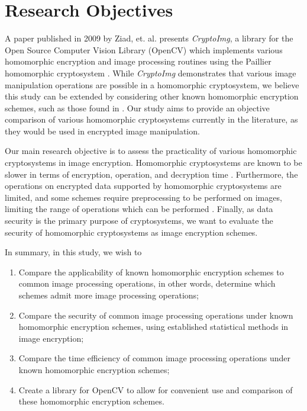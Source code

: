 \section{Research Objectives}

A paper published in 2009 by Ziad, et. al. presents \textit{CryptoImg}, a library for the  Open Source Computer Vision Library (OpenCV) \cite{bradski_opencv_2000} which implements various homomorphic encryption and image processing routines using the Paillier homomorphic cryptosystem \cite{ziad_cryptoimg:_2016}. While \textit{CryptoImg} demonstrates that various image manipulation operations are possible in a homomorphic cryptosystem, we believe this study can be extended by considering other known homomorphic encryption schemes, such as those found in \cite{li_elliptic_2012, hutchison_fully_2010}. Our study aims to provide an objective comparison of various homomorphic cryptosystems currently in the literature, as they would be used in encrypted image manipulation.

Our main research objective is to assess the practicality of various homomorphic cryptosystems in image encryption. Homomorphic cryptosystems are known to be slower in terms of encryption, operation, and decryption time \cite{sen_homomorphic_2013}. Furthermore, the operations on encrypted data supported by homomorphic cryptosystems are limited, and some schemes require preprocessing to be performed on images, limiting the range of operations which can be performed \cite{li_elliptic_2012}. Finally, as data security is the primary purpose of cryptosystems, we want to evaluate the security of homomorphic cryptosystems as image encryption schemes.

In summary, in this study, we wish to
\begin{enumerate}
    \item Compare the applicability of known homomorphic encryption schemes to common image processing operations, in other words, determine which schemes admit more image processing operations;
		\item Compare the security of common image processing operations under known homomorphic encryption schemes, using established statistical methods in image encryption;
    \item Compare the time efficiency of common image processing operations under known homomorphic encryption schemes;
    \item Create a library for OpenCV to allow for convenient use and comparison of these homomorphic encryption schemes.
\end{enumerate}
